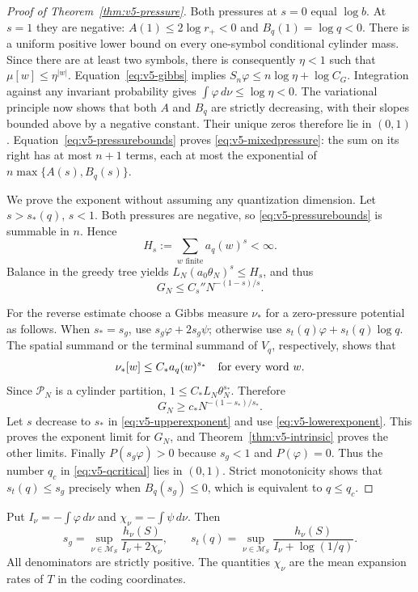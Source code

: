 \begin{proof}[Proof of Theorem~\ref{thm:v5-pressure}]
Both pressures at $s=0$ equal $\log b$. At $s=1$ they are negative:
$A(1)\le2\log r_+<0$ and $B_q(1)=\log q<0$.
There is a uniform positive lower bound on every one-symbol
conditional cylinder mass. Since there are at least two symbols,
there is consequently $\eta<1$ such that $\mu[w]\le\eta^{|w|}$.
Equation~\eqref{eq:v5-gibbs} implies
$S_n\varphi\le n\log\eta+\log C_G$. Integration against any
invariant probability gives $\int\varphi\,d\nu\le\log\eta<0$.
The variational principle now shows that both $A$ and $B_q$ are
strictly decreasing, with their slopes bounded above by a
negative constant. Their unique zeros therefore lie in $(0,1)$.
Equation~\eqref{eq:v5-pressurebounds} proves
\eqref{eq:v5-mixedpressure}: the sum on its right has at most
$n+1$ terms, each at most the exponential of
$n\max\{A(s),B_q(s)\}$.

We prove the exponent without assuming any quantization dimension.
Let $s>s_*(q)$, $s<1$. Both pressures are negative, so
\eqref{eq:v5-pressurebounds} is summable in $n$. Hence
\[
 H_s:=\sum_{w\text{ finite}}a_q(w)^s<\infty.
\]
Balance in the greedy tree yields
$L_N(a_0\theta_N)^s\le H_s$, and thus
\begin{equation}\label{eq:v5-upperexponent}
 G_N\le C_s''N^{-(1-s)/s}.
\end{equation}

For the reverse estimate choose a Gibbs measure $\nu_*$ for a
zero-pressure potential as follows. When $s_*=s_g$, use
$s_g\varphi+2s_g\psi$; otherwise use
$s_t(q)\varphi+s_t(q)\log q$. The spatial summand or the terminal
summand of $V_q$, respectively, shows that
\[
 \nu_*[w]\le C_*a_q(w)^{s_*}
 \quad\hbox{for every word }w.
\]
Since $\mathcal P_N$ is a cylinder partition,
$1\le C_*L_N\theta_N^{s_*}$. Therefore
\begin{equation}\label{eq:v5-lowerexponent}
 G_N\ge c_*N^{-(1-s_*)/s_*}.
\end{equation}
Let $s$ decrease to $s_*$ in \eqref{eq:v5-upperexponent} and use
\eqref{eq:v5-lowerexponent}. This proves the exponent limit for
$G_N$, and Theorem~\ref{thm:v5-intrinsic} proves the other limits.
Finally $P(s_g\varphi)>0$ because $s_g<1$ and $P(\varphi)=0$.
Thus the number $q_c$ in \eqref{eq:v5-qcritical} lies in $(0,1)$.
Strict monotonicity shows that $s_t(q)\le s_g$ precisely when
$B_q(s_g)\le0$, which is equivalent to $q\le q_c$.
\end{proof}

\begin{corollary}\label{cor:v5-variational}
Put $I_\nu=-\int\varphi\,d\nu$ and
$\chi_\nu=-\int\psi\,d\nu$. Then
\begin{equation}\label{eq:v5-variational}
 s_g=\sup_{\nu\in\mathcal M_S}
       \frac{h_\nu(S)}{I_\nu+2\chi_\nu},\qquad
 s_t(q)=\sup_{\nu\in\mathcal M_S}
       \frac{h_\nu(S)}{I_\nu+\log(1/q)}.
\end{equation}
All denominators are strictly positive. The quantities
$\chi_\nu$ are the mean expansion rates of $T$ in the coding
coordinates.
\end{corollary}

